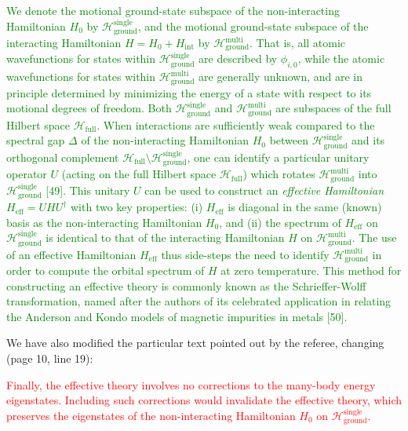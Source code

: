 \documentclass[preprint]{revtex4-1}
\renewcommand{\t}{\text} %
\renewcommand{\H}{\mathcal{H}}
\newcommand{\1}{\mathds{1}}
\newcommand{\red}[1]{\textcolor{red}{#1}}
\newcommand{\green}[1]{\textcolor{green}{#1}}
\begin{document}
\begin{enumerate}
  \green{We denote the motional ground-state subspace of the
    non-interacting Hamiltonian $H_0$ by
    $\H_{\t{ground}}^{\t{single}}$, and the motional ground-state
    subspace of the interacting Hamiltonian $H = H_0 + H_{\t{int}}$ by
    $\H_{\t{ground}}^{\t{multi}}$.  That is, all atomic wavefunctions
    for states within $\H_{\t{ground}}^{\t{single}}$ are described by
    $\phi_{i,0}$, while the atomic wavefunctions for states within
    $\H_{\t{ground}}^{\t{multi}}$ are generally unknown, and are in
    principle determined by minimizing the energy of a state with
    respect to its motional degrees of freedom.  Both
    $\H_{\t{ground}}^{\t{single}}$ and $\H_{\t{ground}}^{\t{multi}}$
    are subspaces of the full Hilbert space $\H_{\t{full}}$.  When
    interactions are sufficiently weak compared to the spectral gap
    $\Delta$ of the non-interacting Hamiltonian $H_0$ between
    $\H_{\t{ground}}^{\t{single}}$ and its orthogonal complement
    $\H_{\t{full}}\setminus\H_{\t{ground}}^{\t{single}}$, one can
    identify a particular unitary operator $U$ (acting on the full
    Hilbert space $\H_{\t{full}}$) which rotates
    $\H_{\t{ground}}^{\t{multi}}$ into $\H_{\t{ground}}^{\t{single}}$
    [49].  This unitary $U$ can be used to construct an {\it effective
      Hamiltonian} $H_{\t{eff}} = U H U^\dag$ with two key properties:
    (i) $H_{\t{eff}}$ is diagonal in the same (known) basis as the
    non-interacting Hamiltonian $H_0$, and (ii) the spectrum of
    $H_{\t{eff}}$ on $\H_{\t{ground}}^{\t{single}}$ is identical to
    that of the interacting Hamiltonian $H$ on
    $\H_{\t{ground}}^{\t{multi}}$.  The use of an effective
    Hamiltonian $H_{\t{eff}}$ thus side-steps the need to identify
    $\H_{\t{ground}}^{\t{multi}}$ in order to compute the orbital
    spectrum of $H$ at zero temperature.  This method for constructing
    an effective theory is commonly known as the Schrieffer-Wolff
    transformation, named after the authors of its celebrated
    application in relating the Anderson and Kondo models of magnetic
    impurities in metals [50].}

  We have also modified the particular text pointed out by the
  referee, changing (page 10, line 19):

  \red{Finally, the effective theory involves no corrections to the
    many-body energy eigenstates.  Including such corrections would
    invalidate the effective theory, which preserves the eigenstates
    of the non-interacting Hamiltonian $H_0$ on
    $\H_{\t{ground}}^{\t{single}}$.}


\end{enumerate}
\end{document}
